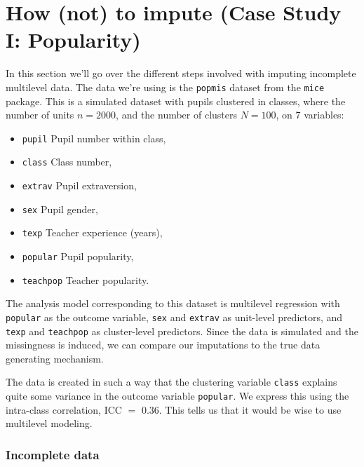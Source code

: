 \documentclass[
]{jss}
\providecommand{\tightlist}{%
  \setlength{\itemsep}{0pt}\setlength{\parskip}{0pt}}
\begin{document}
\hypertarget{how-not-to-impute-case-study-i-popularity}{%
\section{How (not) to impute (Case Study I:
Popularity)}\label{how-not-to-impute-case-study-i-popularity}}

In this section we'll go over the different steps involved with imputing
incomplete multilevel data. The data we're using is the \texttt{popmis}
dataset from the \texttt{mice} package. This is a simulated dataset with
pupils clustered in classes, where the number of units \(n = 2000\), and
the number of clusters \(N = 100\), on 7 variables:

\begin{itemize}
\tightlist
\item
  \texttt{pupil} Pupil number within class,
\item
  \texttt{class} Class number,
\item
  \texttt{extrav} Pupil extraversion,
\item
  \texttt{sex} Pupil gender,
\item
  \texttt{texp} Teacher experience (years),
\item
  \texttt{popular} Pupil popularity,
\item
  \texttt{teachpop} Teacher popularity.
\end{itemize}

The analysis model corresponding to this dataset is multilevel
regression with \texttt{popular} as the outcome variable, \texttt{sex}
and \texttt{extrav} as unit-level predictors, and \texttt{texp} and
\texttt{teachpop} as cluster-level predictors. Since the data is
simulated and the missingness is induced, we can compare our imputations
to the true data generating mechanism.

The data is created in such a way that the clustering variable
\texttt{class} explains quite some variance in the outcome variable
\texttt{popular}. We express this using the intra-class correlation, ICC
\(=\) 0.36. This tells us that it would be wise to use multilevel
modeling.

\hypertarget{incomplete-data}{%
\subsubsection{Incomplete data}\label{incomplete-data}}
\end{document}
